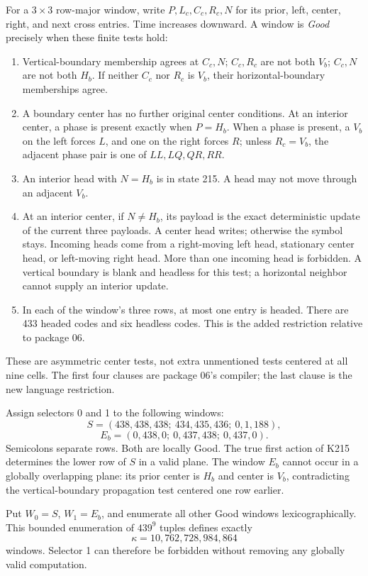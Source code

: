 \documentclass[11pt]{article}
\begin{document}
For a $3\times3$ row-major window, write $P,L_c,C_c,R_c,N$ for its prior, left, center, right, and next cross entries. Time increases downward. A window is \emph{Good} precisely when these finite tests hold:
\begin{enumerate}
\item Vertical-boundary membership agrees at $C_c,N$; $C_c,R_c$ are not both $V_b$; $C_c,N$ are not both $H_b$. If neither $C_c$ nor $R_c$ is $V_b$, their horizontal-boundary memberships agree.
\item A boundary center has no further original center conditions. At an interior center, a phase is present exactly when $P=H_b$. When a phase is present, a $V_b$ on the left forces $L$, and one on the right forces $R$; unless $R_c=V_b$, the adjacent phase pair is one of $LL,LQ,QR,RR$.
\item An interior head with $N=H_b$ is in state 215. A head may not move through an adjacent $V_b$.
\item At an interior center, if $N\neq H_b$, its payload is the exact deterministic update of the current three payloads. A center head writes; otherwise the symbol stays. Incoming heads come from a right-moving left head, stationary center head, or left-moving right head. More than one incoming head is forbidden. A vertical boundary is blank and headless for this test; a horizontal neighbor cannot supply an interior update.
\item In each of the window's three rows, at most one entry is headed. There are 433 headed codes and six headless codes. This is the added restriction relative to package 06.
\end{enumerate}
These are asymmetric center tests, not extra unmentioned tests centered at all nine cells. The first four clauses are package 06's compiler; the last clause is the new language restriction.

Assign selectors 0 and 1 to the following windows:
\[
S=(438,438,438;\ 434,435,436;\ 0,1,188),
\]
\[
E_b=(0,438,0;\ 0,437,438;\ 0,437,0).
\]
Semicolons separate rows. Both are locally Good. The true first action of K215 determines the lower row of $S$ in a valid plane. The window $E_b$ cannot occur in a globally overlapping plane: its prior center is $H_b$ and center is $V_b$, contradicting the vertical-boundary propagation test centered one row earlier.

Put $W_0=S$, $W_1=E_b$, and enumerate all other Good windows lexicographically. This bounded enumeration of $439^9$ tuples defines exactly
\[
\kappa=10{,}762{,}728{,}984{,}864
\]
windows. Selector 1 can therefore be forbidden without removing any globally valid computation.
\end{document}
